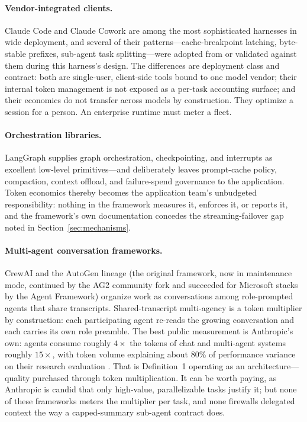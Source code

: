 \documentclass[11pt]{article}
\begin{document}
\paragraph{Vendor-integrated clients.} Claude Code and Claude Cowork \cite{claudecode} are among the most sophisticated harnesses in wide deployment, and several of their patterns---cache-breakpoint latching, byte-stable prefixes, sub-agent task splitting---were adopted from or validated against them during this harness's design. The differences are deployment class and contract: both are single-user, client-side tools bound to one model vendor; their internal token management is not exposed as a per-task accounting surface; and their economics do not transfer across models by construction. They optimize a session for a person. An enterprise runtime must meter a fleet.

\paragraph{Orchestration libraries.} LangGraph \cite{langgraph} supplies graph orchestration, checkpointing, and interrupts as excellent low-level primitives---and deliberately leaves prompt-cache policy, compaction, context offload, and failure-spend governance to the application. Token economics thereby becomes the application team's unbudgeted responsibility: nothing in the framework measures it, enforces it, or reports it, and the framework's own documentation concedes the streaming-failover gap noted in Section~\ref{sec:mechanisms}.

\paragraph{Multi-agent conversation frameworks.} CrewAI \cite{crewai} and the AutoGen lineage \cite{autogen} (the original framework, now in maintenance mode, continued by the AG2 community fork and succeeded for Microsoft stacks by the Agent Framework) organize work as conversations among role-prompted agents that share transcripts. Shared-transcript multi-agency is a token multiplier by construction: each participating agent re-reads the growing conversation and each carries its own role preamble. The best public measurement is Anthropic's own: agents consume roughly $4\times$ the tokens of chat and multi-agent systems roughly $15\times$, with token volume explaining about 80\% of performance variance on their research evaluation \cite{anthmulti}. That is Definition~1 operating as an architecture---quality purchased through token multiplication. It can be worth paying, as Anthropic is candid that only high-value, parallelizable tasks justify it; but none of these frameworks meters the multiplier per task, and none firewalls delegated context the way a capped-summary sub-agent contract does.
\end{document}
